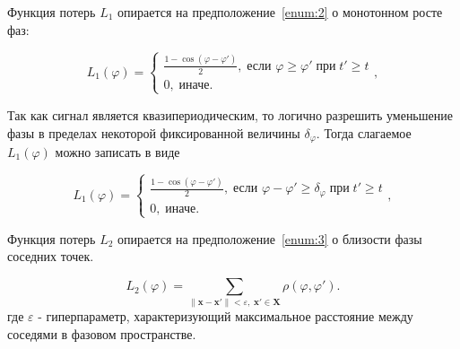 \documentclass[12pt, twoside]{article}
\theoremstyle{definition}
\def\eps{\varepsilon}
\begin{document}
Функция потерь $L_1$ опирается на предположение~\ref{enum:2} о монотонном росте фаз:

\begin{equation}      
    L_1(\varphi) =
    \begin{cases}
        \frac{1-\cos(\varphi-\varphi')}{2},\;
            \text{если } \varphi \geq \varphi' \;\text{при}\; t' \geq t\\
        0, \;
            \text{иначе.}
    \end{cases},
\label{eq:L1} 
\end{equation}



Так как сигнал является квазипериодическим, то логично разрешить уменьшение фазы в пределах некоторой фиксированной величины $\delta_{\varphi}$. Тогда слагаемое $L_1(\varphi)$ можно записать в виде

\begin{equation}      
    L_1(\varphi) =
    \begin{cases}
        \frac{1-\cos(\varphi-\varphi')}{2},\;
            \text{если } \varphi - \varphi' \geq \delta_{\varphi} \;\text{при}\; t' \geq t\\
        0, \;
            \text{иначе.}
    \end{cases},
\label{eq:L1_2} 
\end{equation}


Функция потерь $L_2$ опирается на предположение~\ref{enum:3} о близости фазы соседних точек.

\begin{equation}           
    L_2(\varphi) = 
    \sum_{\| \mathbf{x} - \mathbf{x'} \|<\eps, \; \mathbf{x'} \in \mathbf{X}}
    \rho( \varphi, \varphi').
\label{eq:L2} 
\end{equation}
где $\eps$ - гиперпараметр, характеризующий максимальное расстояние между соседями в фазовом пространстве. 
\end{document}
